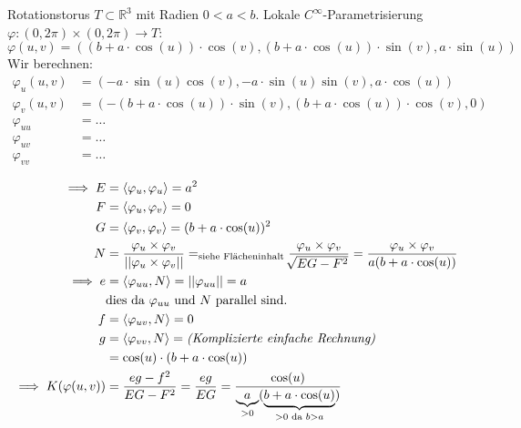 \documentclass[../main.tex]{subfiles}
\begin{document}
\begin{example}
    Rotationstorus $T\subset\mathbb{R}^{3}$ mit Radien $0<a<b$.
    Lokale $C^{\infty}$-Parametrisierung $\varphi : (0,2\pi)\times (0,2\pi)\to T$:
    $$\varphi(u,v) = ((b+a\cdot \cos(u))\cdot \cos(v), (b+a\cdot \cos(u))\cdot \sin(v), a\cdot \sin(u))$$
    Wir berechnen:
    \begin{align*}
        \varphi_{u}(u,v) &= (-a\cdot \sin(u)\cos(v), -a\cdot \sin(u)\sin(v), a\cdot \cos(u))\\
        \varphi_{v}(u,v) &= (-(b+a\cdot \cos(u))\cdot \sin(v), (b+a\cdot \cos(u))\cdot \cos(v), 0)\\
        \varphi_{uu} &= \dots\\
        \varphi_{uv} &= \dots\\
        \varphi_{vv} &= \dots\\
    \end{align*}
    \begin{align*}
        \implies E &= \langle \varphi_{u}, \varphi_{u}\rangle = a^{2}\\
        F &= \langle \varphi_{u}, \varphi_{v}\rangle = 0\\
        G &= \langle \varphi_{v}, \varphi_{v}\rangle = (b+a\cdot \cos(u))^{2}\\
        N &= \frac{\varphi_{u}\times\varphi_{v}}{||\varphi_{u}\times\varphi_{v}||} =_{\text{siehe Flächeninhalt}} \frac{\varphi_{u}\times\varphi_{v}}{\sqrt[]{EG-F^{2}}} = \frac{\varphi_{u}\times\varphi_{v}}{a(b+a\cdot \cos(u))}\\
        \implies e &= \langle\varphi_{uu}, N\rangle = ||\varphi_{uu}|| = a\\
        &\text{dies da }\varphi_{uu} \text{ und }N \text{ parallel sind.}\\
        f &= \langle\varphi_{uv},N\rangle = 0\\
        g &= \langle\varphi_{vv},N\rangle = \text{\emph{(Komplizierte einfache Rechnung)}} \\
        &= \cos(u)\cdot(b+a\cdot \cos(u))\\
        \implies K(\varphi(u,v)) &= \frac{eg-f^{2}}{EG-F^{2}} = \frac{eg}{EG} = \frac{\cos(u)}{\underbrace{a}_{>0}(\underbrace{b+a\cdot \cos(u)}_{>0 \text{ da } b>a})}
    \end{align*}
    \begin{figure}[htb]
        \centering
        \def\svgwidth{\textwidth}
        
    \end{figure}
\end{example}
\end{document}
